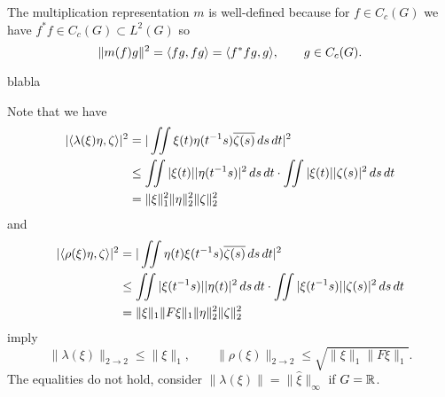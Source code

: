 \documentclass{../../large}
\begin{document}
\begin{pf}
The multiplication representation $m$ is well-defined because for $f\in C_c(G)$ we have $f^*f\in C_c(G)\subset L^2(G)$ so
\[\|m(f)g\|^2=\langle fg,fg\rangle=\langle f^*fg,g\rangle,\qquad g\in C_c(G).\]


blabla

Note that we have
\begin{align*}
|\langle\lambda(\xi)\eta,\zeta\rangle|^2
&=|\iint\xi(t)\eta(t^{-1}s)\overline{\zeta(s)}\,ds\,dt|^2\\
&\le\iint|\xi(t)||\eta(t^{-1}s)|^2\,ds\,dt\cdot\iint|\xi(t)||\zeta(s)|^2\,ds\,dt\\
&=\|\xi\|_1^2\|\eta\|_2^2\|\zeta\|_2^2
\end{align*}
and
\begin{align*}
|\langle\rho(\xi)\eta,\zeta\rangle|^2
&=|\iint\eta(t)\xi(t^{-1}s)\overline{\zeta(s)}\,ds\,dt|^2\\
&\le\iint|\xi(t^{-1}s)||\eta(t)|^2\,ds\,dt\cdot\iint|\xi(t^{-1}s)||\zeta(s)|^2\,ds\,dt\\
&=\|\xi\|_1\|F\xi\|_1\|\eta\|_2^2\|\zeta\|_2^2
\end{align*}
imply
\[\|\lambda(\xi)\|_{2\to2}\le\|\xi\|_1,\qquad\|\rho(\xi)\|_{2\to2}\le\sqrt{\|\xi\|_1\|F\xi\|_1}.\]
The equalities do not hold, consider $\|\lambda(\xi)\|=\|\hat\xi\|_\infty$ if $G=\mathbb{R}$.



\end{pf}
\end{document}
